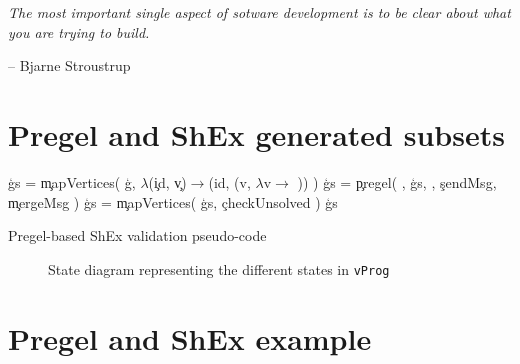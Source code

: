 \epigraph{\textit{The most important single aspect of sotware development is to be clear about what you are trying to build.}}{-- \textup{Bjarne Stroustrup}}

\section{Pregel and ShEx generated subsets}



\begin{algorithm}[!hbt]
    \DontPrintSemicolon
    \SetAlgoVlined
    \blockskip
    \c{gs} = \c{mapVertices}( \c{g}, $\lambda$(\c{id}, \c{v})$\rightarrow$(id, (v, $\lambda$v$ \rightarrow$ \Undefined)) )  \;
    \c{gs} = \c{pregel}( \Validate, \c{gs}, \vProg, \c{sendMsg}, \c{mergeMsg} ) \;
    \c{gs} = \c{mapVertices}( \c{gs}, \c{checkUnsolved} ) \;
    \Return\c{gs} \;
    \blockskip
    \\
    \caption{Pregel-based ShEx validation pseudo-code~\cite{https://doi.org/10.48550/arxiv.2110.11709}}
    \label{alogorithm:PSchema}
\end{algorithm}

\begin{figure}[ht]
    \centering
    
    \caption[State diagram representing the different states in \texttt{vProg}]{State diagram representing the different states in \texttt{vProg}~\cite{https://doi.org/10.48550/arxiv.2110.11709}}
    \label{fig:pregelState}
\end{figure}

\section{Pregel and ShEx example}